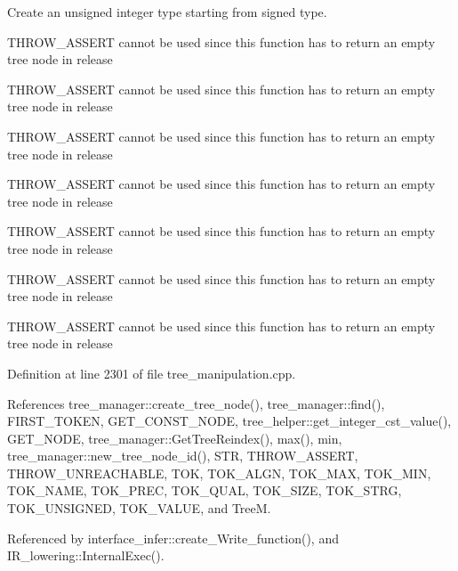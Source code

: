 Create an unsigned integer type starting from signed type. 

T\+H\+R\+O\+W\+\_\+\+A\+S\+S\+E\+RT cannot be used since this function has to return an empty tree node in release

T\+H\+R\+O\+W\+\_\+\+A\+S\+S\+E\+RT cannot be used since this function has to return an empty tree node in release

T\+H\+R\+O\+W\+\_\+\+A\+S\+S\+E\+RT cannot be used since this function has to return an empty tree node in release

T\+H\+R\+O\+W\+\_\+\+A\+S\+S\+E\+RT cannot be used since this function has to return an empty tree node in release

T\+H\+R\+O\+W\+\_\+\+A\+S\+S\+E\+RT cannot be used since this function has to return an empty tree node in release

T\+H\+R\+O\+W\+\_\+\+A\+S\+S\+E\+RT cannot be used since this function has to return an empty tree node in release

T\+H\+R\+O\+W\+\_\+\+A\+S\+S\+E\+RT cannot be used since this function has to return an empty tree node in release 

Definition at line 2301 of file tree\+\_\+manipulation.\+cpp.



References tree\+\_\+manager\+::create\+\_\+tree\+\_\+node(), tree\+\_\+manager\+::find(), F\+I\+R\+S\+T\+\_\+\+T\+O\+K\+EN, G\+E\+T\+\_\+\+C\+O\+N\+S\+T\+\_\+\+N\+O\+DE, tree\+\_\+helper\+::get\+\_\+integer\+\_\+cst\+\_\+value(), G\+E\+T\+\_\+\+N\+O\+DE, tree\+\_\+manager\+::\+Get\+Tree\+Reindex(), max(), min, tree\+\_\+manager\+::new\+\_\+tree\+\_\+node\+\_\+id(), S\+TR, T\+H\+R\+O\+W\+\_\+\+A\+S\+S\+E\+RT, T\+H\+R\+O\+W\+\_\+\+U\+N\+R\+E\+A\+C\+H\+A\+B\+LE, T\+OK, T\+O\+K\+\_\+\+A\+L\+GN, T\+O\+K\+\_\+\+M\+AX, T\+O\+K\+\_\+\+M\+IN, T\+O\+K\+\_\+\+N\+A\+ME, T\+O\+K\+\_\+\+P\+R\+EC, T\+O\+K\+\_\+\+Q\+U\+AL, T\+O\+K\+\_\+\+S\+I\+ZE, T\+O\+K\+\_\+\+S\+T\+RG, T\+O\+K\+\_\+\+U\+N\+S\+I\+G\+N\+ED, T\+O\+K\+\_\+\+V\+A\+L\+UE, and TreeM.



Referenced by interface\+\_\+infer\+::create\+\_\+\+Write\+\_\+function(), and I\+R\+\_\+lowering\+::\+Internal\+Exec().

